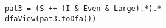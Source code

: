 \begin{lstlisting}[style=reclojureScala]
pat3 = (S ++ (I & Even & Large).*).*
dfaView(pat3.toDfa())
\end{lstlisting}
